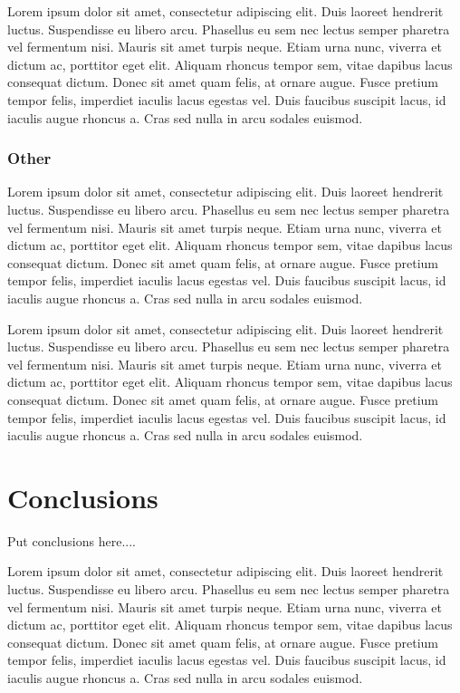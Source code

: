 \documentclass[final,conference,11pt]{IEEEtran}
\begin{document}
Lorem ipsum dolor sit amet, consectetur adipiscing elit. Duis laoreet hendrerit luctus. Suspendisse eu libero arcu. Phasellus eu sem nec lectus semper pharetra vel fermentum nisi. Mauris sit amet turpis neque. Etiam urna nunc, viverra et dictum ac, porttitor eget elit. Aliquam rhoncus tempor sem, vitae dapibus lacus consequat dictum. Donec sit amet quam felis, at ornare augue. Fusce pretium tempor felis, imperdiet iaculis lacus egestas vel. Duis faucibus suscipit lacus, id iaculis augue rhoncus a. Cras sed nulla in arcu sodales euismod.

\subsubsection{Other}
Lorem ipsum dolor sit amet, consectetur adipiscing elit. Duis laoreet hendrerit luctus. Suspendisse eu libero arcu. Phasellus eu sem nec lectus semper pharetra vel fermentum nisi. Mauris sit amet turpis neque. Etiam urna nunc, viverra et dictum ac, porttitor eget elit. Aliquam rhoncus tempor sem, vitae dapibus lacus consequat dictum. Donec sit amet quam felis, at ornare augue. Fusce pretium tempor felis, imperdiet iaculis lacus egestas vel. Duis faucibus suscipit lacus, id iaculis augue rhoncus a. Cras sed nulla in arcu sodales euismod.

Lorem ipsum dolor sit amet, consectetur adipiscing elit. Duis laoreet hendrerit luctus. Suspendisse eu libero arcu. Phasellus eu sem nec lectus semper pharetra vel fermentum nisi. Mauris sit amet turpis neque. Etiam urna nunc, viverra et dictum ac, porttitor eget elit. Aliquam rhoncus tempor sem, vitae dapibus lacus consequat dictum. Donec sit amet quam felis, at ornare augue. Fusce pretium tempor felis, imperdiet iaculis lacus egestas vel. Duis faucibus suscipit lacus, id iaculis augue rhoncus a. Cras sed nulla in arcu sodales euismod.

\section{Conclusions}

Put conclusions here....

Lorem ipsum dolor sit amet, consectetur adipiscing elit. Duis laoreet hendrerit luctus. Suspendisse eu libero arcu. Phasellus eu sem nec lectus semper pharetra vel fermentum nisi. Mauris sit amet turpis neque. Etiam urna nunc, viverra et dictum ac, porttitor eget elit. Aliquam rhoncus tempor sem, vitae dapibus lacus consequat dictum. Donec sit amet quam felis, at ornare augue. Fusce pretium tempor felis, imperdiet iaculis lacus egestas vel. Duis faucibus suscipit lacus, id iaculis augue rhoncus a. Cras sed nulla in arcu sodales euismod.
\end{document}
